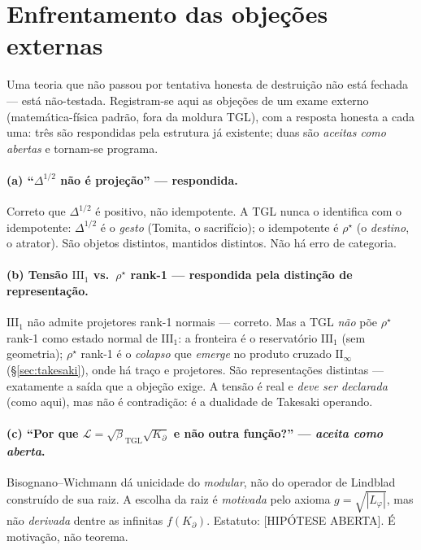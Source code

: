 \documentclass[11pt,a4paper]{article}
\newcommand{\ABERTO}{\textsf{[HIPÓTESE ABERTA]}}
\newcommand{\bTGL}{\beta_{\mathrm{TGL}}}
\begin{document}
\section{Enfrentamento das objeções externas}\label{sec:objecoes}
Uma teoria que não passou por tentativa honesta de destruição não está
fechada --- está não-testada. Registram-se aqui as objeções de um exame
externo (matemática-física padrão, fora da moldura TGL), com a resposta
honesta a cada uma: três são respondidas pela estrutura já existente; duas
são \emph{aceitas como abertas} e tornam-se programa.

\paragraph{(a) ``$\Delta^{1/2}$ não é projeção'' --- respondida.}
Correto que $\Delta^{1/2}$ é positivo, não idempotente. A TGL nunca o
identifica com o idempotente: $\Delta^{1/2}$ é o \emph{gesto} (Tomita, o
sacrifício); o idempotente é $\rho^\star$ (o \emph{destino}, o atrator). São
objetos distintos, mantidos distintos. Não há erro de categoria.

\paragraph{(b) Tensão $\mathrm{III}_1$ vs.\ $\rho^\star$ rank-1 ---
respondida pela distinção de representação.}
$\mathrm{III}_1$ não admite projetores rank-1 normais --- correto. Mas a TGL
\emph{não} põe $\rho^\star$ rank-1 como estado normal de $\mathrm{III}_1$: a
fronteira é o reservatório $\mathrm{III}_1$ (sem geometria); $\rho^\star$
rank-1 é o \emph{colapso} que \emph{emerge} no produto cruzado
$\mathrm{II}_\infty$ (\S\ref{sec:takesaki}), onde há traço e projetores. São
representações distintas --- exatamente a saída que a objeção exige. A tensão
é real e \emph{deve ser declarada} (como aqui), mas não é contradição: é a
dualidade de Takesaki operando.

\paragraph{(c) ``Por que $\mathcal L=\sqrt\bTGL\sqrt{K_\partial}$ e não outra
função?'' --- \emph{aceita como aberta}.}
Bisognano--Wichmann dá unicidade do \emph{modular}, não do operador de
Lindblad construído de sua raiz. A escolha da raiz é \emph{motivada} pelo
axioma $g=\sqrt{|L_\varphi|}$, mas não \emph{derivada} dentre as infinitas
$f(K_\partial)$. Estatuto: \ABERTO. É motivação, não teorema.
\end{document}
